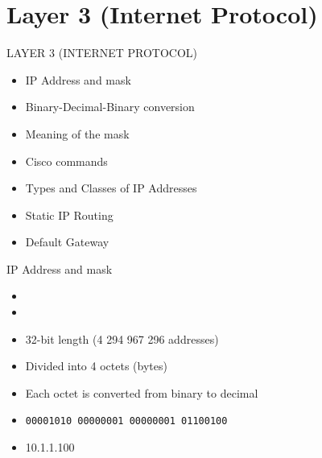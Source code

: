 \section[ipv4]{Layer 3 (Internet Protocol)}

\begin{frame}{LAYER 3 (INTERNET PROTOCOL)}
	\begin{itemize}
		\item IP Address and mask
		\item Binary-Decimal-Binary conversion
		\item Meaning of the mask
		\item Cisco commands
		\item Types and Classes of IP Addresses
		\item Static IP Routing
		\item Default Gateway
	\end{itemize}
\end{frame}

\begin{frame}{IP Address and mask}
	\begin{itemize}[<+->]
		\item {}
		\item {}
		\item 32-bit length (4 294 967 296 addresses)
		\item Divided into 4 octets (bytes)
		\item Each octet is converted from binary to decimal
		\item \texttt{00001010 00000001 00000001 01100100}
		\item 10.1.1.100
	\end{itemize}
\end{frame}


